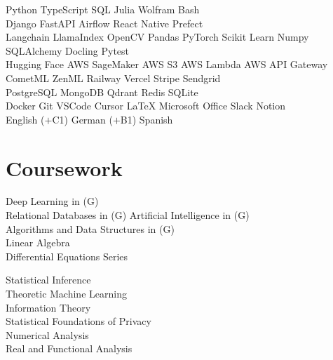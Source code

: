 \documentclass[]{tex/deedy-resume-openfont}
\begin{document}
\begin{minipage}[t]{0.32\textwidth}
Python \textbullet{} 
TypeScript \textbullet{} 
SQL \textbullet{} 
Julia \textbullet{} 
Wolfram \textbullet{} 
Bash \\[4pt]

Django \textbullet{} 
FastAPI \textbullet{} 
Airflow \textbullet{} 
React Native \textbullet{} 
Prefect \\[4pt]


Langchain \textbullet{} 
LlamaIndex \textbullet{} 
OpenCV \textbullet{} 
Pandas \textbullet{} 
PyTorch \textbullet{} 
Scikit Learn \textbullet{} 
Numpy \textbullet{} 
SQLAlchemy \textbullet{} 
Docling \textbullet{} 
Pytest \\[4pt]

Hugging Face \textbullet{} 
AWS SageMaker \textbullet{} 
AWS S3 \textbullet{} 
AWS Lambda \textbullet{} 
AWS API Gateway \textbullet{} 
CometML \textbullet{} 
ZenML \textbullet{} 
Railway \textbullet{} 
Vercel \textbullet{} 
Stripe \textbullet{} 
Sendgrid \\[4pt]

PostgreSQL \textbullet{} 
MongoDB \textbullet{} 
Qdrant \textbullet{} 
Redis \textbullet{} 
SQLite \\[4pt]

Docker \textbullet{} 
Git \textbullet{} 
VSCode \textbullet{} 
Cursor \textbullet{} 
\LaTeX{} \textbullet{} 
Microsoft Office \textbullet{} 
Slack \textbullet{} 
Notion \\[6pt]

English ($+$C1) \textbullet{} German ($+$B1) \textbullet{} Spanish


\section{Coursework}
Deep Learning in (G)\\
Relational Databases in  (G)
Artificial Intelligence in  (G)\\
Algorithms and Data Structures in  (G)\\
Linear Algebra\\
Differential Equations Series\\

\sectionsep

Statistical Inference\\
Theoretic Machine Learning\\
Information Theory\\
Statistical Foundations of Privacy\\
Numerical Analysis \\
Real and Functional Analysis\\


%
%

\end{minipage} 
\end{document}
